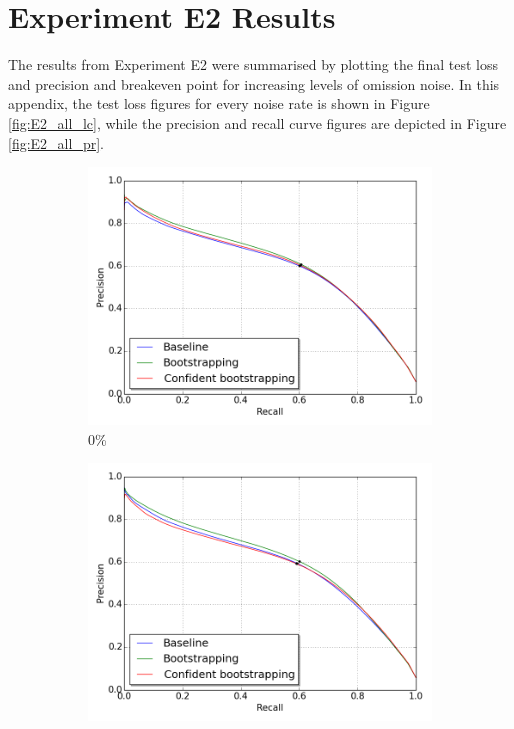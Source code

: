 \section{Experiment E2 Results}
\label{app:fullE5results}
The results from Experiment E2 were summarised by plotting the final test loss and precision and breakeven point for increasing levels of omission noise. In this appendix, the test loss figures for every noise rate is shown in Figure \ref{fig:E2_all_lc}, while the precision and recall curve figures are depicted in Figure \ref{fig:E2_all_pr}.
\begin{figure}[H]
\begin{subfigure}{0.31\textwidth}
\includegraphics[width=\textwidth]{figs/E2/pr_0.png}
\caption{ 0\% } \label{fig:app_E2_0_pr}
\vspace{-0.1cm} %
\end{subfigure}
\hspace*{\fill} %
\begin{subfigure}{0.31\textwidth}
\includegraphics[width=\textwidth]{figs/E2/pr_1.png}

\end{subfigure}
\end{figure}

